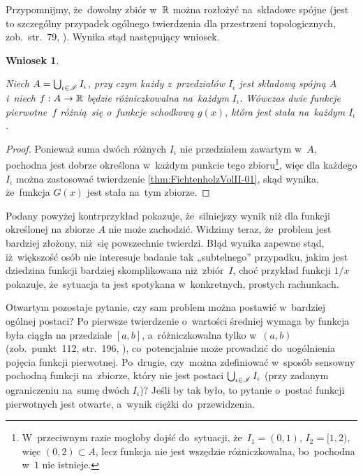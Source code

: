 \documentclass[a4paper,11pt]{article}
\numberwithin{equation}{section}
\newtheorem{corollary}{Wniosek}
\begin{document}
Przypomnijmy, że~dowolny zbiór w~$\mathbb{R}$ można rozłożyć na~składowe
spójne (jest to szczególny przypadek ogólnego twierdzenia dla
przestrzeni topologicznych, zob.~str.~79,
\cite{SchwartzKursAnalizyMatematycznejVolI1979}). Wynika stąd
następujący wniosek.





\begin{corollary}
  \label{cor:FichtenholzVolII-01}

  Niech $A = \bigcup_{ \iota \in \mathcal{I} } I_{ \iota }$, przy czym każdy
  z~przedziałów
  $I_{ \iota }$ jest składową spójną $A$ i~niech $f: A \to \mathbb{R}$
  będzie różniczkowalna na~każdym $I_{ \iota }$. Wówczas dwie funkcje
  pierwotne~$f$ różnią~się o~funkcje schodkową $g( x )$, która jest
  stała na~każdym $I_{ \iota }$.

\end{corollary}



\begin{proof}

  Ponieważ suma dwóch różnych $I_{ \iota }$ nie przedziałem zawartym
  w~$A$, pochodna jest dobrze określona w~każdym punkcie tego
  zbioru\footnote{W~przeciwnym razie mogłoby dojść do~sytuacji,
    że~$I_{ 1 } = (0, 1)$, $I_{ 2 } = [ 1, 2 )$, więc
    $( 0, 2 ) \subset A$, lecz funkcja nie jest wszędzie
    różniczkowalna, bo~pochodna w~$1$ nie istnieje.}, więc dla każdego
  $I_{ \iota }$ można zastosować twierdzenie
  \ref{thm:FichtenholzVolII-01}, skąd wynika, że~funkcja $G( x )$ jest
  stała na~tym zbiorze.

\end{proof}





Podany powyżej kontrprzykład pokazuje, że~silniejszy wynik niż dla
funkcji określonej na zbiorze $A$ nie może zachodzić. Widzimy teraz,
że~problem jest bardziej złożony, niż~się powszechnie twierdzi. Błąd
wynika zapewne stąd, iż~większość osób nie interesuje badanie tak
„subtelnego” przypadku, jakim jest dziedzina funkcji bardziej
skomplikowana niż~zbiór~$I$, choć przykład funkcji $1 / x$ pokazuje,
że~sytuacja ta jest spotykana w~konkretnych, prostych rachunkach.

Otwartym pozostaje pytanie, czy sam problem można postawić w~bardziej
ogólnej postaci? Po pierwsze twierdzenie o~wartości średniej wymaga by
funkcja była ciągła na przedziale $[ a, b ]$, a~różniczkowalna tylko
w~$( a, b )$ (zob.~punkt~112, str.~196,
\cite{FichtenholzRachunekRozniczkowyETCVolI2005}), co~potencjalnie
może prowadzić do~uogólnienia pojęcia funkcji pierwotnej. Po~drugie,
czy~można zdefiniować w~sposób sensowny pochodną funkcji na~zbiorze,
który nie jest postaci $\bigcup_{ \iota \in \mathcal{I} } I_{ \iota }$ (przy
zadanym ograniczeniu na~sumę dwóch $I_{ \iota }$)? Jeśli by tak było,
to pytanie o~postać funkcji pierwotnych jest otwarte, a~wynik ciężki
do~przewidzenia.
\end{document}
